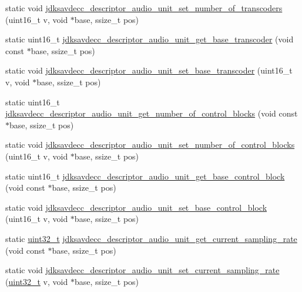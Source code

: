 \begin{DoxyCompactItemize}
\item 
static void \hyperlink{group__descriptor__audio_gaa0b8f99a4ffb2e6b3c458c0777083ae3}{jdksavdecc\+\_\+descriptor\+\_\+audio\+\_\+unit\+\_\+set\+\_\+number\+\_\+of\+\_\+transcoders} (uint16\+\_\+t v, void $\ast$base, ssize\+\_\+t pos)
\item 
static uint16\+\_\+t \hyperlink{group__descriptor__audio_ga255b528b5d801b3c172b8d199e03ef42}{jdksavdecc\+\_\+descriptor\+\_\+audio\+\_\+unit\+\_\+get\+\_\+base\+\_\+transcoder} (void const $\ast$base, ssize\+\_\+t pos)
\item 
static void \hyperlink{group__descriptor__audio_ga84ea8577e0b944b9fb401f49047bb78c}{jdksavdecc\+\_\+descriptor\+\_\+audio\+\_\+unit\+\_\+set\+\_\+base\+\_\+transcoder} (uint16\+\_\+t v, void $\ast$base, ssize\+\_\+t pos)
\item 
static uint16\+\_\+t \hyperlink{group__descriptor__audio_ga30d371f29fe321c59cc09f811fb280b6}{jdksavdecc\+\_\+descriptor\+\_\+audio\+\_\+unit\+\_\+get\+\_\+number\+\_\+of\+\_\+control\+\_\+blocks} (void const $\ast$base, ssize\+\_\+t pos)
\item 
static void \hyperlink{group__descriptor__audio_ga30fce7f32ad24820647a671371b4bf2a}{jdksavdecc\+\_\+descriptor\+\_\+audio\+\_\+unit\+\_\+set\+\_\+number\+\_\+of\+\_\+control\+\_\+blocks} (uint16\+\_\+t v, void $\ast$base, ssize\+\_\+t pos)
\item 
static uint16\+\_\+t \hyperlink{group__descriptor__audio_ga618003ae29a76ad480334653c52cb393}{jdksavdecc\+\_\+descriptor\+\_\+audio\+\_\+unit\+\_\+get\+\_\+base\+\_\+control\+\_\+block} (void const $\ast$base, ssize\+\_\+t pos)
\item 
static void \hyperlink{group__descriptor__audio_gaf655be770dbc6acc56c3605f544148b9}{jdksavdecc\+\_\+descriptor\+\_\+audio\+\_\+unit\+\_\+set\+\_\+base\+\_\+control\+\_\+block} (uint16\+\_\+t v, void $\ast$base, ssize\+\_\+t pos)
\item 
static \hyperlink{parse_8c_a6eb1e68cc391dd753bc8ce896dbb8315}{uint32\+\_\+t} \hyperlink{group__descriptor__audio_gaf64e490813c4a70bd63a6f00374cb639}{jdksavdecc\+\_\+descriptor\+\_\+audio\+\_\+unit\+\_\+get\+\_\+current\+\_\+sampling\+\_\+rate} (void const $\ast$base, ssize\+\_\+t pos)
\item 
static void \hyperlink{group__descriptor__audio_gaa80221c15885669f38f552b9acb2c59f}{jdksavdecc\+\_\+descriptor\+\_\+audio\+\_\+unit\+\_\+set\+\_\+current\+\_\+sampling\+\_\+rate} (\hyperlink{parse_8c_a6eb1e68cc391dd753bc8ce896dbb8315}{uint32\+\_\+t} v, void $\ast$base, ssize\+\_\+t pos)

\end{DoxyCompactItemize}
